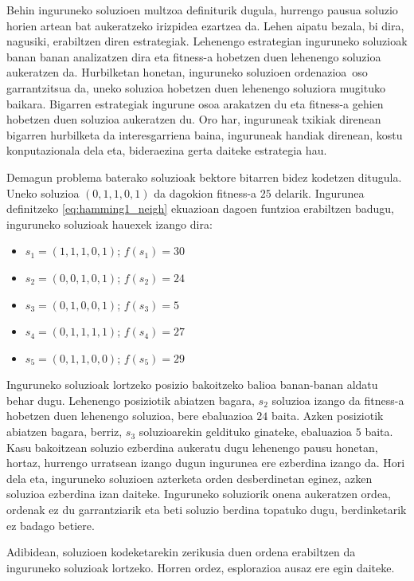 \documentclass[eu]{ifirak}\usepackage[]{graphicx}\usepackage[]{color}
\newcommand{\zkk}{\guillemotleft}
\newcommand{\skk}{\guillemotright}
\begin{document}
Behin inguruneko soluzioen multzoa definiturik dugula, hurrengo pausua soluzio horien artean bat aukeratzeko irizpidea ezartzea da. Lehen aipatu bezala, bi dira, nagusiki, erabiltzen diren estrategiak. Lehenengo estrategian inguruneko soluzioak banan banan analizatzen dira eta fitness-a hobetzen duen lehenengo soluzioa aukeratzen da. Hurbilketan honetan, inguruneko soluzioen \zkk ordenazioa\skk\ oso garrantzitsua da, uneko soluzioa hobetzen duen lehenengo soluziora mugituko baikara. Bigarren estrategiak ingurune osoa arakatzen du eta fitness-a gehien hobetzen duen soluzioa aukeratzen du. Oro har, inguruneak txikiak direnean bigarren hurbilketa da interesgarriena baina, inguruneak handiak direnean, kostu konputazionala dela eta, bideraezina gerta daiteke estrategia hau.

\begin{tcolorbox}
\begin{ifexample}
Demagun problema baterako soluzioak bektore bitarren bidez kodetzen ditugula. Uneko soluzioa $(0,1,1,0,1)$ da dagokion fitness-a $25$ delarik. Ingurunea definitzeko \eqref{eq:hamming1_neigh} ekuazioan dagoen funtzioa erabiltzen badugu, inguruneko soluzioak hauexek izango dira:
\begin{itemize}
\item $s_1=(1,1,1,0,1)$; $f(s_1)=30$
\item $s_2=(0,0,1,0,1)$; $f(s_2)=24$
\item $s_3=(0,1,0,0,1)$; $f(s_3)=5$
\item $s_4=(0,1,1,1,1)$; $f(s_4)=27$
\item $s_5=(0,1,1,0,0)$; $f(s_5)=29$
\end{itemize} 
Inguruneko soluzioak lortzeko posizio bakoitzeko balioa banan-banan aldatu behar dugu. Lehenengo posiziotik abiatzen bagara, $s_2$ soluzioa izango da fitness-a hobetzen duen lehenengo soluzioa, bere ebaluazioa $24$ baita. Azken posiziotik abiatzen bagara, berriz, $s_3$ soluzioarekin geldituko ginateke, ebaluazioa $5$ baita. Kasu bakoitzean soluzio ezberdina aukeratu dugu lehenengo pausu honetan, hortaz, hurrengo urratsean izango dugun ingurunea ere ezberdina izango da. Hori dela eta, inguruneko soluzioen azterketa orden desberdinetan eginez, azken soluzioa ezberdina izan daiteke. Inguruneko soluziorik onena aukeratzen ordea, ordenak ez du garrantziarik eta beti soluzio berdina topatuko dugu, berdinketarik ez badago betiere.
\end{ifexample}
\end{tcolorbox}

Adibidean, soluzioen kodeketarekin zerikusia duen ordena erabiltzen da inguruneko soluzioak lortzeko. Horren ordez, esplorazioa ausaz ere egin daiteke.
\end{document}
